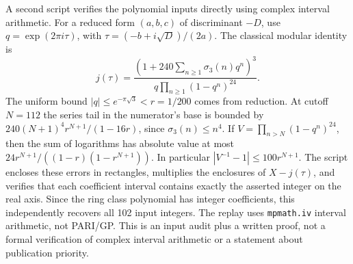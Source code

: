 \documentclass[11pt]{article}
\begin{document}
A second script verifies the polynomial inputs directly using complex
interval arithmetic. For a reduced form \((a,b,c)\) of discriminant
\(-D\), use \(q=\exp(2\pi i\tau)\), with
\(\tau=(-b+i\sqrt D)/(2a)\). The classical modular identity is
\[
 j(\tau)=\frac{(1+240\sum_{n\ge1}\sigma_3(n)q^n)^3}
                  {q\prod_{n\ge1}(1-q^n)^{24}}.
\]
The uniform bound \(|q|\le e^{-\pi\sqrt3}<r=1/200\) comes from
reduction. At cutoff \(N=112\) the series tail in the numerator's
base is bounded by
\(240(N+1)^4r^{N+1}/(1-16r)\), since \(\sigma_3(n)\le n^4\).
If \(V=\prod_{n>N}(1-q^n)^{24}\), then the sum of logarithms has
absolute value at most \(24r^{N+1}/((1-r)(1-r^{N+1}))\).
In particular \( |V^{-1}-1|\le100r^{N+1}\).
The script encloses these errors in rectangles, multiplies the
enclosures of \(X-j(\tau)\), and verifies that each coefficient
interval contains exactly the asserted integer on the real axis.
Since the ring class polynomial has integer coefficients, this
independently recovers all 102 input integers. The replay uses
\texttt{mpmath.iv} interval arithmetic, not PARI/GP. This is an
input audit plus a written proof, not a formal verification of
complex interval arithmetic or a statement about publication priority.
\end{document}
